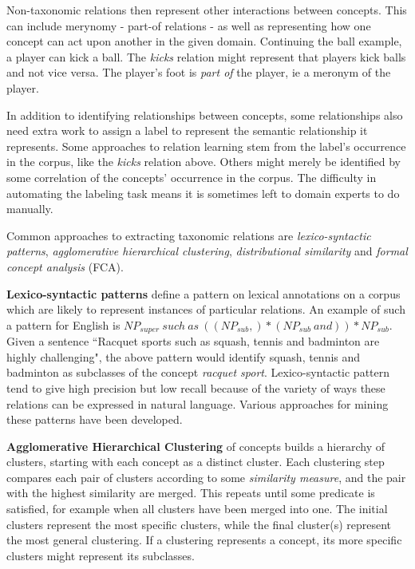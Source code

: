 \documentclass[a4paper]{report}
\begin{document}
Non-taxonomic relations then represent other interactions between concepts.
This can include merynomy - part-of relations - as well as representing how one concept can act upon another in the given domain.
Continuing the ball example, a player can kick a ball.
The \emph{kicks} relation might represent that players kick balls and not vice versa.
The player's foot is \emph{part of} the player, ie a meronym of the player.

In addition to identifying relationships between concepts, some relationships also need extra work to assign a label to represent the semantic relationship it represents.
Some approaches to relation learning stem from the label's occurrence in the corpus, like the \emph{kicks} relation above.
Others might merely be identified by some correlation of the concepts' occurrence in the corpus.
The difficulty in automating the labeling task means it is sometimes left to domain experts to do manually.

\medskip
Common approaches to extracting taxonomic relations are \emph{lexico-syntactic patterns}, \emph{agglomerative hierarchical clustering}, \emph{distributional similarity} and \emph{formal concept analysis} (FCA).

{\bfseries Lexico-syntactic patterns} define a pattern on lexical annotations on a corpus which are likely to represent instances of particular relations.
An example of such a pattern for English is $NP_{super}\ such\ as\ ((NP_{sub}, )* (NP_{sub}\ and))* NP_{sub}$.
Given a sentence ``Racquet sports such as squash, tennis and badminton are highly challenging", the above pattern would identify squash, tennis and badminton as subclasses of the concept \emph{racquet sport}.
Lexico-syntactic pattern tend to give high precision but low recall because of the variety of ways these relations can be expressed in natural language.
Various approaches for mining these patterns have been developed.

{\bfseries Agglomerative Hierarchical Clustering} of concepts builds a hierarchy of clusters, starting with each concept as a distinct cluster.
Each clustering step compares each pair of clusters according to some \emph{similarity measure}, and the pair with the highest similarity are merged.
This repeats until some predicate is satisfied, for example when all clusters have been merged into one.
The initial clusters represent the most specific clusters, while the final cluster(s) represent the most general clustering.
If a clustering represents a concept, its more specific clusters might represent its subclasses.
\end{document}
